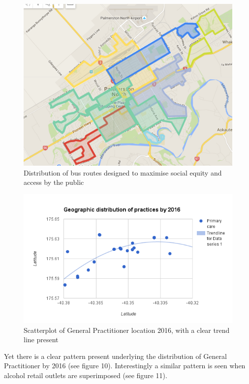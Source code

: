 \documentclass[11pt,a4paper]{article}
\begin{document}
\begin{figure}[htp]
\centering
\includegraphics[scale=0.3]{fig9.png}
\caption{Distribution of bus routes designed to maximise social equity and access by the public}
\label{Bus routes designed to maximise equity of access}
\end{figure}

\begin{figure}[htp]
\centering
\includegraphics[scale=0.6]{Nash_GP_2016.png}
\caption{Scatterplot of General Practitioner location 2016, with a clear trend line present}
\label{Scatter plot of General Practitioner locations}
\end{figure}

Yet there is a clear pattern present underlying the distribution of General Practitioner by 2016 (see figure 10). Interestingly a similar pattern is seen when alcohol retail outlets are superimposed (see figure 11). \\
\end{document}
